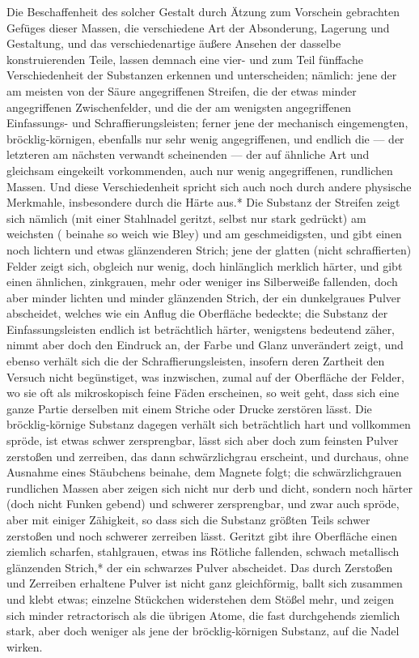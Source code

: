 \documentclass[a4paper, 11pt, oneside, german]{article}
\begin{document}
Die Beschaffenheit des solcher Gestalt durch Ätzung zum Vorschein gebrachten Gefüges dieser Massen, die verschiedene Art der Absonderung, Lagerung und Gestaltung, und das verschiedenartige äußere Ansehen der dasselbe konstruierenden Teile, lassen demnach eine vier- und zum Teil fünffache Verschiedenheit der Substanzen erkennen und unterscheiden; nämlich: jene der am meisten von der Säure angegriffenen Streifen, die der etwas minder angegriffenen Zwischenfelder, und die der am wenigsten angegriffenen Einfassungs- und Schraffierungsleisten; ferner jene der mechanisch eingemengten, bröcklig-körnigen, ebenfalls nur sehr wenig angegriffenen, und endlich die --- der letzteren am nächsten verwandt scheinenden --- der auf ähnliche Art und gleichsam eingekeilt vorkommenden, auch nur wenig angegriffenen, rundlichen Massen. Und diese Verschiedenheit spricht sich auch noch durch andere physische Merkmahle, insbesondere durch die Härte aus.* Die Substanz der Streifen zeigt sich nämlich (mit einer Stahlnadel geritzt, selbst nur stark gedrückt) am weichsten ( beinahe so weich wie Bley) und am geschmeidigsten, und gibt einen noch lichtern und etwas glänzenderen Strich; jene der glatten (nicht schraffierten) Felder zeigt sich, obgleich nur wenig, doch hinlänglich merklich härter, und gibt einen ähnlichen, zinkgrauen, mehr oder weniger ins Silberweiße fallenden, doch aber minder lichten und minder glänzenden Strich, der ein dunkelgraues Pulver abscheidet, welches wie ein Anflug die Oberfläche bedeckte; die Substanz der Einfassungsleisten endlich ist beträchtlich härter, wenigstens bedeutend zäher, nimmt aber doch den Eindruck an, der Farbe und Glanz unverändert zeigt, und ebenso verhält sich die der Schraffierungsleisten, insofern deren Zartheit den Versuch nicht begünstiget, was inzwischen, zumal auf der Oberfläche der Felder, wo sie oft als mikroskopisch feine Fäden erscheinen, so weit geht, dass sich eine ganze Partie derselben mit einem Striche oder Drucke zerstören lässt. Die bröcklig-körnige Substanz dagegen verhält sich beträchtlich hart und vollkommen spröde, ist etwas schwer zersprengbar, lässt sich aber doch zum feinsten Pulver zerstoßen und zerreiben, das dann schwärzlichgrau erscheint, und durchaus, ohne Ausnahme eines Stäubchens beinahe, dem Magnete folgt; die schwärzlichgrauen rundlichen Massen aber zeigen sich nicht nur derb und dicht, sondern noch härter (doch nicht Funken gebend) und schwerer zersprengbar, und zwar auch spröde, aber mit einiger Zähigkeit, so dass sich die Substanz größten Teils schwer zerstoßen und noch schwerer zerreiben lässt. Geritzt gibt ihre Oberfläche einen ziemlich scharfen, stahlgrauen, etwas ins Rötliche fallenden, schwach metallisch glänzenden Strich,* der ein schwarzes Pulver abscheidet. Das durch Zerstoßen und Zerreiben erhaltene Pulver ist nicht ganz gleichförmig, ballt sich zusammen und klebt etwas; einzelne Stückchen widerstehen dem Stößel mehr, und zeigen sich minder retractorisch als die übrigen Atome, die fast durchgehends ziemlich stark, aber doch weniger als jene der bröcklig-körnigen Substanz, auf die Nadel wirken.
\end{document}
